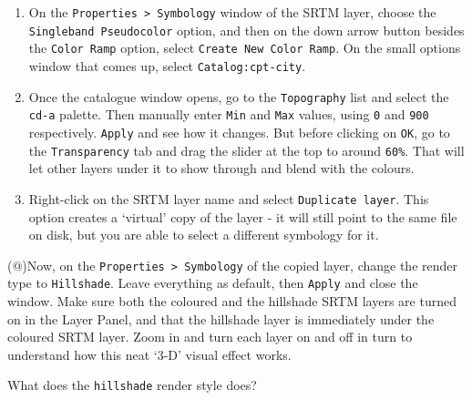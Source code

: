 \documentclass[
  letterpaper,
  DIV=11,
  numbers=noendperiod]{scrreprt}
\begin{document}
\begin{enumerate}
\def\labelenumi{(\arabic{enumi})}
\setcounter{enumi}{140}
\item
  On the \texttt{Properties\ \textgreater{}\ Symbology} window of the
  SRTM layer, choose the \texttt{Singleband\ Pseudocolor} option, and
  then on the down arrow button besides the \texttt{Color\ Ramp} option,
  select \texttt{Create\ New\ Color\ Ramp}. On the small options window
  that comes up, select \texttt{Catalog:cpt-city}.
\item
  Once the catalogue window opens, go to the \texttt{Topography} list
  and select the \texttt{cd-a} palette. Then manually enter \texttt{Min}
  and \texttt{Max} values, using \texttt{0} and \texttt{900}
  respectively. \texttt{Apply} and see how it changes. But before
  clicking on \texttt{OK}, go to the \texttt{Transparency} tab and drag
  the slider at the top to around \texttt{60\%}. That will let other
  layers under it to show through and blend with the colours.
\item
  Right-click on the SRTM layer name and select
  \texttt{Duplicate\ layer}. This option creates a `virtual' copy of the
  layer - it will still point to the same file on disk, but you are able
  to select a different symbology for it.
\end{enumerate}

(@)Now, on the \texttt{Properties\ \textgreater{}\ Symbology} of the
copied layer, change the render type to \texttt{Hillshade}. Leave
everything as default, then \texttt{Apply} and close the window. Make
sure both the coloured and the hillshade SRTM layers are turned on in
the Layer Panel, and that the hillshade layer is immediately under the
coloured SRTM layer. Zoom in and turn each layer on and off in turn to
understand how this neat `3-D' visual effect works.

\begin{tcolorbox}[enhanced jigsaw, coltitle=black, toprule=.15mm, breakable, opacitybacktitle=0.6, left=2mm, colback=white, leftrule=.75mm, rightrule=.15mm, colbacktitle=quarto-callout-important-color!10!white, toptitle=1mm, titlerule=0mm, colframe=quarto-callout-important-color-frame, arc=.35mm, bottomtitle=1mm, opacityback=0, bottomrule=.15mm, title=\textcolor{quarto-callout-important-color}{\faExclamation}\hspace{0.5em}{Stop and Think}]

What does the \texttt{hillshade} render style does?

\end{tcolorbox}
\end{document}
